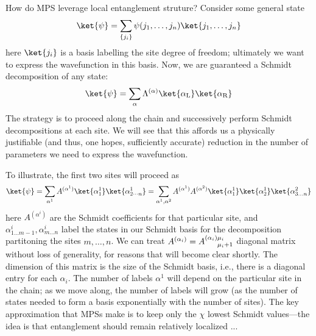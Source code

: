 \documentclass{report}
\begin{document}
How do MPS leverage local entanglement struture? Consider some general state 
\begin{equation*}
	\ket{\psi} 
		= \sum_{\left\{j_i\right\}} \psi(j_1, \dots, j_n)\ket{j_1, \dots,j_n}
\end{equation*}
here $ \ket{j_i} $ is a basis labelling the site degree of freedom; ultimately 
we want to express the wavefunction in this basis. Now, we are guaranteed 
a Schmidt decomposition of any state:
\begin{equation*}
	\ket{\psi}
	= \sum_{\alpha} \Lambda^{(\alpha)} \ket{\alpha_{\text{L}}}\ket{\alpha_{\text{R}}}
\end{equation*}
The strategy is to proceed along the chain and successively perform Schmidt 
decompositions at each site. We will see that this affords us a physically 
justifiable (and thus, one hopes, sufficiently accurate) reduction in the number of
parameters we need to express the wavefunction.

To illustrate, the first two sites will proceed as 
\begin{equation*}
	\ket{\psi} = \sum_{\alpha^1} A^{(\alpha^1)} \ket{\alpha^1_1} \ket{\alpha^1_{2\cdots n}}
		= \sum_{\alpha^1, \alpha^2} A^{(\alpha^1)}A^{(\alpha^2)}
		\ket{\alpha^1_1}\ket{\alpha^1_2}\ket{\alpha^2_{3\dots n}}
\end{equation*}
here $ A^{(\alpha^i)} $ are the Schmidt coefficients for that particular site, 
and $ \alpha^i_{1\dots m-1},\alpha^i_{m\dots n} $ label the states in our Schmidt basis for the 
decomposition partitoning the sites $ m,\dots,n $.
We can treat $ A^{(\alpha_i)}=  A^{(\alpha_i)\mu_i}_{\hphantom{(\alpha_i)} \mu_i+1} $ 
diagonal matrix without loss of generality, for reasons that will become clear shortly.
The dimension of this matrix is the size of the Schmidt basis, i.e., there is a 
diagonal entry for each $ \alpha_i $. 
The number of labels $ \alpha^1 $ will depend on the particular site in the
chain; as we move along, the number of labels will grow (as the number of states
needed to form a basis exponentially with the number of sites).
The key approximation that MPSs make is to keep only the $ \chi $ lowest 
Schmidt values---the idea is that entanglement should remain relatively localized 
...
\end{document}
